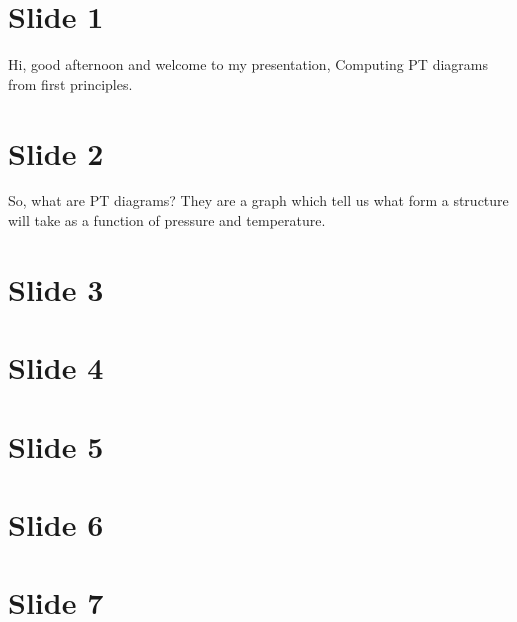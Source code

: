 \documentclass[12pt]{article}
\begin{document}
\section*{Slide 1}
Hi, good afternoon and welcome to my presentation, Computing PT diagrams from first principles.
\section*{Slide 2}
So, what are PT diagrams? They are a graph which tell us what form a structure will take as a function of pressure and temperature.
\section*{Slide 3}
\section*{Slide 4}
\section*{Slide 5}
\section*{Slide 6}
\section*{Slide 7}
\end{document}
